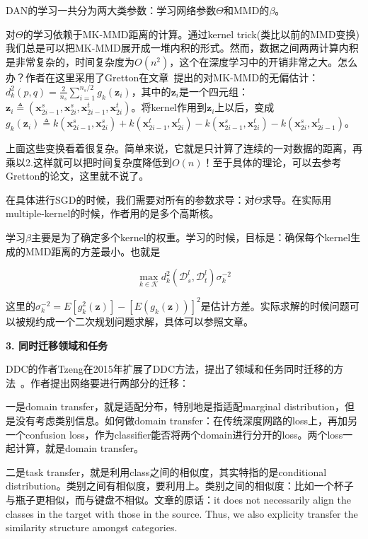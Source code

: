 DAN的学习一共分为两大类参数：学习网络参数$\Theta$和MMD的$\beta$。

对$\Theta$的学习依赖于MK-MMD距离的计算。通过kernel trick(类比以前的MMD变换)我们总是可以把MK-MMD展开成一堆内积的形式。然而，数据之间两两计算内积是非常复杂的，时间复杂度为$O(n^2)$，这个在深度学习中的开销非常之大。怎么办？作者在这里采用了Gretton在文章~\cite{gretton2012optimal}提出的对MK-MMD的无偏估计：$d^2_k(p,q)=\frac{2}{n_s}\sum_{i=1}^{n_s/2}g_k(\mathbf{z}_i)$，其中的$\mathbf{z}_i$是一个四元组：$\mathbf{z}_i \triangleq (\mathbf{x}^s_{2i-1},\mathbf{x}^s_{2i},\mathbf{x}^t_{2i-1},\mathbf{x}^t_{2i})$。将kernel作用到$\mathbf{z}_i$上以后，变成$g_k(\mathbf{z}_i) \triangleq k(\mathbf{x}^s_{2i-1},\mathbf{x}^s_{2i})+k(\mathbf{x}^t_{2i-1},\mathbf{x}^t_{2i})-k(\mathbf{x}^s_{2i-1},\mathbf{x}^t_{2i})-k(\mathbf{x}^s_{2i},\mathbf{x}^t_{2i-1})$。

上面这些变换看着很复杂。简单来说，它就是只计算了连续的一对数据的距离，再乘以2.这样就可以把时间复杂度降低到$O(n)$！至于具体的理论，可以去参考Gretton的论文，这里就不说了。

在具体进行SGD的时候，我们需要对所有的参数求导：对$\Theta$求导。在实际用multiple-kernel的时候，作者用的是多个高斯核。

学习$\beta$主要是为了确定多个kernel的权重。学习的时候，目标是：确保每个kernel生成的MMD距离的方差最小。也就是

\begin{equation}
	\max_{k \in \mathcal{K}} d^2_k(\mathcal{D}^l_s,\mathcal{D}^l_t) \sigma^{-2}_k
\end{equation}

这里的$\sigma^{-2}_k=E[g^2_k(\mathbf{z})]-[E(g_k(\mathbf{z}))]^2$是估计方差。实际求解的时候问题可以被规约成一个二次规划问题求解，具体可以参照文章。

\textbf{3. 同时迁移领域和任务}

DDC的作者Tzeng在2015年扩展了DDC方法，提出了领域和任务同时迁移的方法~\cite{tzeng2015simultaneous}。作者提出网络要进行两部分的迁移：

一是domain transfer，就是适配分布，特别地是指适配marginal distribution，但是没有考虑类别信息。如何做domain transfer：在传统深度网路的loss上，再加另一个confusion loss，作为classifier能否将两个domain进行分开的loss。两个loss一起计算，就是domain transfer。

二是task transfer，就是利用class之间的相似度，其实特指的是conditional distribution。类别之间有相似度，要利用上。类别之间的相似度：比如一个杯子与瓶子更相似，而与键盘不相似。文章的原话：it does not necessarily align the classes in the target with those in the source. Thus, we also explicity transfer the similarity structure amongst categories.

